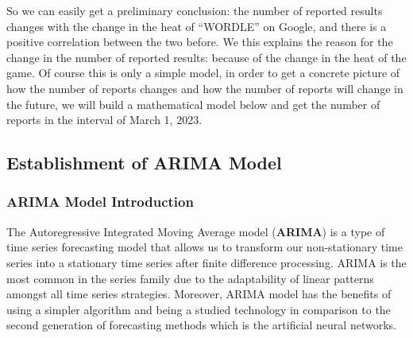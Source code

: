 \documentclass[12pt]{article}  %
\begin{document}
So we can easily get a preliminary conclusion: the number of reported results changes with the change in the heat of ``WORDLE'' on Google, and there is a positive correlation between the two before. We this explains the reason for the change in the number of reported results: because of the change in the heat of the game. Of course this is only a simple model, in order to get a concrete picture of how the number of reports changes and how the number of reports will change in the future, we will build a mathematical model below and get the number of reports in the interval of March 1, 2023.
\subsection{Establishment of ARIMA Model}
\subsubsection{ARIMA Model Introduction}
The Autoregressive Integrated Moving Average model (\textbf{ARIMA}) is a type of time series forecasting model that allows us to transform our non-stationary time series into a stationary time series after finite difference processing. ARIMA is the most common in the series family due to the adaptability of linear patterns amongst
all time series strategies. Moreover, ARIMA model has the benefits of using a simpler algorithm and being
a studied technology in comparison to the second generation of forecasting methods which is the artificial neural
networks.
\end{document}
